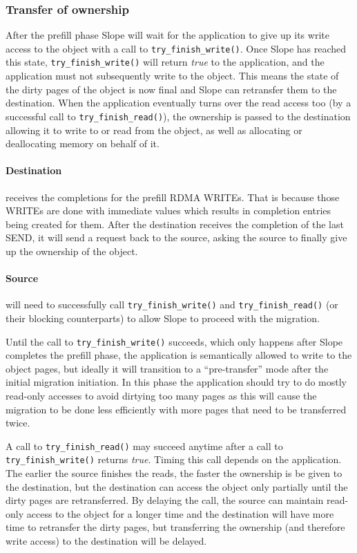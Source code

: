 \subsubsection{Transfer of ownership}
\label{sec:transowner}
After the prefill phase Slope will wait for the application to give up its write
access to the object
with a call to \texttt{try\_finish\_write()}. Once Slope has reached
this state, \texttt{try\_finish\_write()} will return \emph{true} to the application,
and the application must not subsequently write to the object.
This means the state of the dirty pages of the object is now final and
Slope can retransfer them to the destination. When the
application eventually turns over the read access too (by a successful call
to \texttt{try\_finish\_read()}), the ownership is passed
to the destination allowing it to write to or read from the object,
as well as allocating or deallocating memory on behalf of it.

\paragraph{Destination} receives the completions for the prefill RDMA WRITEs.
That is because those WRITEs are done with immediate values which results
in completion entries being created for them. After the destination
receives the completion of the
last SEND, it will send a request back to the source, asking the source to
finally give up the ownership of the object.

\paragraph{Source} will need to successfully call
\texttt{try\_finish\_write()} and \texttt{try\_finish\_read()} (or their
blocking counterparts) to allow Slope to proceed with the migration.

Until the call to \texttt{try\_finish\_write()} succeeds, which only happens
after Slope completes the prefill phase, the application is
semantically allowed to write to the object pages, but ideally it will
transition to a ``pre-transfer'' mode after the initial migration
initiation. In this phase the application should try to do mostly read-only
accesses to avoid dirtying too many pages as this will cause the migration
to be done less efficiently with more pages that need to be transferred twice.

A call to \texttt{try\_finish\_read()} may succeed anytime after a call to
\texttt{try\_finish\_write()} returns \emph{true}. Timing this call depends on the
application. The earlier the source finishes the reads, the faster the
ownership is be given to the destination, but the destination can access the
object only partially until the dirty pages are retransferred. By delaying the
call, the source can maintain read-only access to the object for a longer time
and the destination will have more time to retransfer the dirty pages, but
transferring the ownership (and therefore write access) to the destination
will be delayed.

